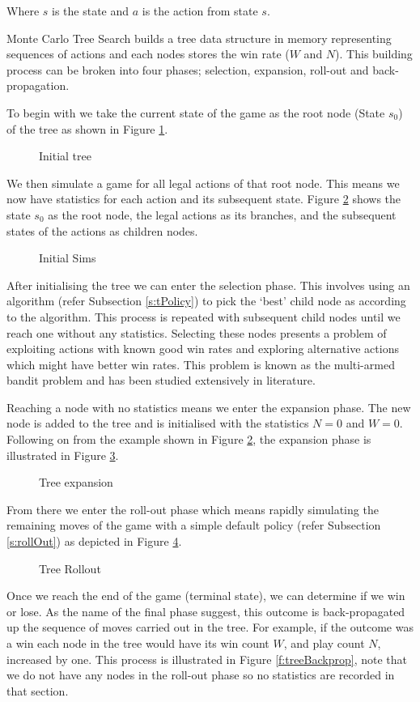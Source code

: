 \documentclass{bhamthesis}
\theoremstyle{definition}
\begin{document}
Where $s$ is the state and $a$ is the action from state $s$.

Monte Carlo Tree Search builds a tree data structure in memory representing sequences of actions and each nodes stores the win rate ($W$ and $N$). This building process can be broken into four phases; selection, expansion, roll-out and back-propagation.

To begin with we take the current state of the game as the root node (State $s_0$) of the tree as shown in Figure \ref{f:initTree}.
\begin{figure}
	
	\caption{Initial tree}\label{f:initTree}
\end{figure}
We then simulate a game for all legal actions of that root node. This means we now have statistics for each action and its subsequent state. Figure \ref{f:initSim} shows the state $s_0$ as the root node, the legal actions as its branches, and the subsequent states of the actions as children nodes.
\begin{figure}
	
	\caption{Initial Sims}\label{f:initSim}
\end{figure}
After initialising the tree we can enter the selection phase. This involves using an algorithm (refer Subsection \ref{s:tPolicy}) to pick the `best' child node as according to the algorithm. This process is repeated with subsequent child nodes until we reach one without any statistics. Selecting these nodes presents a problem of exploiting actions with known good win rates and exploring alternative actions which might have better win rates. This problem is known as the multi-armed bandit problem and has been studied extensively in literature.

Reaching a node with no statistics means we enter the expansion phase. The new node is added to the tree and is initialised with the statistics $N=0$ and $W=0$. Following on from the example shown in Figure \ref{f:initSim}, the expansion phase is illustrated in Figure \ref{f:treeExpansion}.
\begin{figure}
	
	\caption{Tree expansion}\label{f:treeExpansion}
\end{figure}
From there we enter the roll-out phase which means rapidly simulating the remaining moves of the game with a simple default policy (refer Subsection \ref{s:rollOut}) as depicted in Figure \ref{f:treeRollout}.
\begin{figure}
	
	\caption{Tree Rollout}\label{f:treeRollout}
\end{figure} 
Once we reach the end of the game (terminal state), we can determine if we win or lose. As the name of the final phase suggest, this outcome is back-propagated up the sequence of moves carried out in the tree. For example, if the outcome was a win each node in the tree would have its win count $W$, and play count $N$, increased by one. This process is illustrated in Figure \ref{f:treeBackprop}, note that we do not have any nodes in the roll-out phase so no statistics are recorded in that section.
\end{document}
